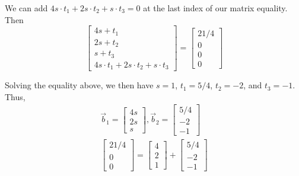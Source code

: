 \documentclass[a4paper,10pt]{article}
\begin{document}
\begin{enumerate}
\begin{enumerate}
{        We can add $4s \cdot t_1 + 2s \cdot t_2 + s \cdot t_3 = 0$ at the last index of our matrix equality. Then
        \[
        \begin{bmatrix} 4s + t_1 \\ 2s + t_2 \\ s + t_3 \\ 4s \cdot t_1 + 2s \cdot t_2 + s \cdot t_3\end{bmatrix} = \begin{bmatrix} 21/4 \\ 0 \\ 0 \\ 0 \end{bmatrix}
        \]

        Solving the equality above, we then have $s = 1$, $t_1 = 5/4$, $t_2 = -2$, and $t_3 = -1$. Thus, 
        \begin{align}
            \vec{b}_1 = \begin{bmatrix}4s \\ 2s \\ s\end{bmatrix}, \vec{b}_2 = \begin{bmatrix}5/4 \\ -2 \\ -1\end{bmatrix} \\ 
            \begin{bmatrix}21/4 \\ 0 \\ 0\end{bmatrix} = \begin{bmatrix}4 \\ 2 \\ 1\end{bmatrix} + \begin{bmatrix}5/4 \\ -2 \\ -1\end{bmatrix}
        \end{align}
    }


\end{enumerate}
\end{enumerate}
\end{document}
